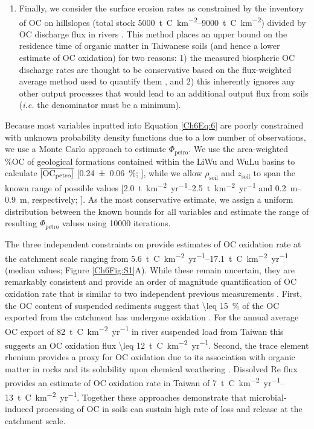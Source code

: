 \begin{enumerate}[label=(\textit{\roman*})]
%
\item Finally, we consider the surface erosion rates as constrained by the inventory of OC on hillslopes (total stock \SIrange{5000}{9000}{t.C.km^{-2}}) divided by OC discharge flux in rivers \citep[\SIrange{11}{31}{t.C.km^{-2}.yr^{-1}};][]{Hilton:2012dt}. This method places an upper bound on the residence time of organic matter in Taiwanese soils (and hence a lower estimate of OC oxidation) for two reasons: 1) the measured biospheric OC discharge rates are thought to be conservative based on the flux-weighted average method used to quantify them \citep{Hilton:2012dt}, and 2) this inherently ignores any other output processes that would lead to an additional output flux from soils (\textit{i.e.} the denominator must be a minimum).
%
\end{enumerate}

Because most variables inputted into Equation \ref{Ch6Eq:6} are poorly constrained with unknown probability density functions due to a low number of observations, we use a Monte Carlo approach to estimate $\Phi_{\text{petro}}$. We use the area-weighted \%OC of geological formations contained within the LiWu and WuLu basins to calculate $\overline{[\text{OC}_{\text{petro}}]}$ 
[\SI{0.24 \pm 0.06}{\%}; \citealp{Hilton:2010cg}], while we allow $\rho_{\text{soil}}$ and $z_{\text{soil}}$ to span the known range of possible values [\SIrange{2.0}{2.5}{t.km^{-2}.yr^{-1}} and \SIrange{0.2}{0.9}{m}, respectively; \citealp{Tsai:2001vp}]. As the most conservative estimate, we assign a uniform distribution between the known bounds for all variables and estimate the range of resulting  $\Phi_{\text{petro}}$ values using \num{10000} iterations.

The three independent constraints on  provide estimates of OC oxidation rate at the catchment scale ranging from \SIrange{5.6}{17.1}{t.C.km^{-2}.yr^{-1}} (median values; Figure \ref{Ch6Fig:S1}A). While these remain uncertain, they are remarkably consistent and provide an order of magnitude quantification of OC oxidation rate that is similar to two independent previous measurements \citep[Figure \ref{Ch6Fig:S2}B;][]{Hilton:2011jw,Hilton:2014dh}. First, the OC content of suspended sediments suggest that \SI{\leq 15}{\%} of the OC exported from the catchment has undergone oxidation \citep{Hilton:2011jw}. For the annual average OC export of \SI{82}{t.C.km^{-2}.yr^{-1}} in river suspended load from Taiwan \citep{Hilton:2011jw} this suggests an OC oxidation flux \SI{\leq 12}{t.C.km^{-2}.yr^{-1}}. Second, the trace element rhenium provides a proxy for OC oxidation \citep{Jaffe:2002wya,Dalai:2002wg} due to its association with organic matter in rocks \citep{Selby:2003iq} and its solubility upon chemical weathering \citep{Colodner:1993tl}. Dissolved Re flux provides an estimate of OC oxidation rate in Taiwan of \SIrange{7}{13}{t.C.km^{-2}.yr^{-1}}. Together these approaches demonstrate that microbial-induced processing of OC in soils can sustain high rate of loss and  release at the catchment scale.

